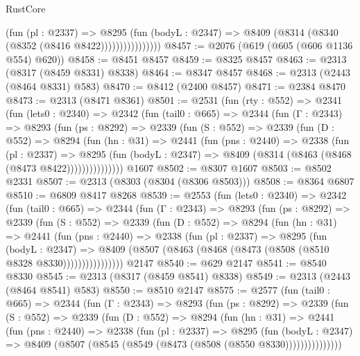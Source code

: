 \begin{lexlean}{RustCore}
\begin{coremodule}
                        (fun (pl : @2337) =>
                        @8295
                          (fun (bodyL : @2347) =>
                          @8409 (@8314 (@8340 (@8352 (@8416 @8422))))))))))))))))
@8457 := @2076 (@619 (@605 (@606 @1136 @554) @620))
@8458 := @8451 @8457
@8459 := @8325 @8457
@8463 := @2313 (@8317 (@8459 @8331) @8338)
@8464 := @8347 @8457
@8468 := @2313 (@2443 (@8464 @8331) @583)
@8470 := @8412 (@2400 @8457)
@8471 := @2384 @8470
@8473 := @2313 (@8471 @8361)
@8501 := @2531
    (fun (rty : @552) =>
    @2341
      (fun (lets0 : @2340) =>
      @2342
        (fun (tail0 : @665) =>
        @2344
          (fun (Γ : @2343) =>
          @8293
            (fun (ps : @8292) =>
            @2339
              (fun (S : @552) =>
              @2339
                (fun (D : @552) =>
                @8294
                  (fun (hn : @31) =>
                  @2441
                    (fun (pns : @2440) =>
                    @2338
                      (fun (pl : @2337) =>
                      @8295
                        (fun (bodyL : @2347) =>
                        @8409 (@8314 (@8463 (@8468 (@8473 @8422)))))))))))))))
    @1607
@8502 := @8307 @1607
@8503 := @8502 @2331
@8507 := @2313 (@8303 (@8304 (@8306 @8503)))
@8508 := @8364 @6807
@8510 := @6809 @8417 @8268
@8539 := @2553
    (fun (lets0 : @2340) =>
    @2342
      (fun (tail0 : @665) =>
      @2344
        (fun (Γ : @2343) =>
        @8293
          (fun (ps : @8292) =>
          @2339
            (fun (S : @552) =>
            @2339
              (fun (D : @552) =>
              @8294
                (fun (hn : @31) =>
                @2441
                  (fun (pns : @2440) =>
                  @2338
                    (fun (pl : @2337) =>
                    @8295
                      (fun (bodyL : @2347) =>
                      @8409 (@8507 (@8463 (@8468 (@8473 (@8508 (@8510 @8328 @8330))))))))))))))))
    @2147
@8540 := @629 @2147
@8541 := @8540 @8330
@8545 := @2313 (@8317 (@8459 @8541) @8338)
@8549 := @2313 (@2443 (@8464 @8541) @583)
@8550 := @8510 @2147
@8575 := @2577
    (fun (tail0 : @665) =>
    @2344
      (fun (Γ : @2343) =>
      @8293
        (fun (ps : @8292) =>
        @2339
          (fun (S : @552) =>
          @2339
            (fun (D : @552) =>
            @8294
              (fun (hn : @31) =>
              @2441
                (fun (pns : @2440) =>
                @2338
                  (fun (pl : @2337) =>
                  @8295
                    (fun (bodyL : @2347) =>
                    @8409 (@8507 (@8545 (@8549 (@8473 (@8508 (@8550 @8330)))))))))))))))

\end{coremodule}
\end{lexlean}
